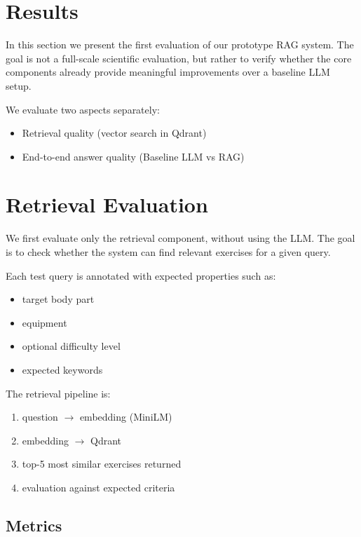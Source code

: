 \documentclass[fleqn,moreauthors,10pt]{ds_report}
\begin{document}
\section*{Results}

In this section we present the first evaluation of our prototype RAG system. 
The goal is not a full-scale scientific evaluation, but rather to verify whether the core components already provide meaningful improvements over a baseline LLM setup.

We evaluate two aspects separately:

\begin{itemize}
\item Retrieval quality (vector search in Qdrant)
\item End-to-end answer quality (Baseline LLM vs RAG)
\end{itemize}

\section*{Retrieval Evaluation}

We first evaluate only the retrieval component, without using the LLM. The goal is to check whether the system can find relevant exercises for a given query.

Each test query is annotated with expected properties such as:

\begin{itemize}
\item target body part
\item equipment
\item optional difficulty level
\item expected keywords
\end{itemize}

The retrieval pipeline is:

\begin{enumerate}
\item question $\rightarrow$ embedding (MiniLM)
\item embedding $\rightarrow$ Qdrant
\item top-5 most similar exercises returned
\item evaluation against expected criteria
\end{enumerate}

\subsection*{Metrics}
\end{document}
